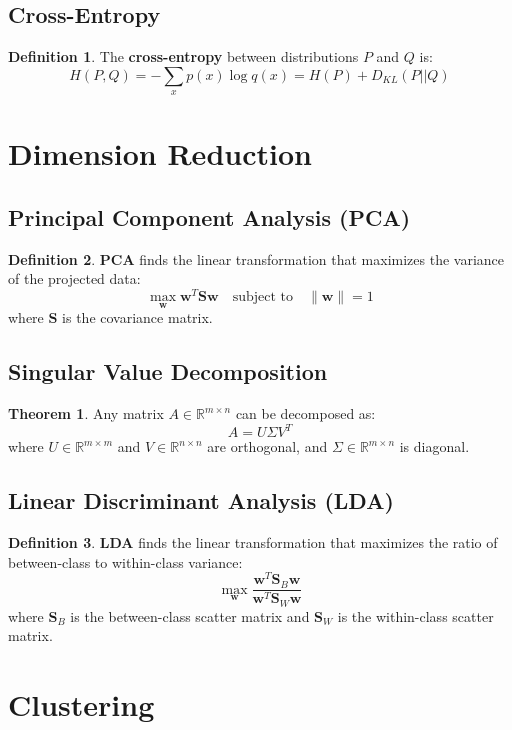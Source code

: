 \documentclass[11pt]{article}
\theoremstyle{definition}
\newtheorem{definition}{Definition}[section]
\newtheorem{theorem}{Theorem}[section]
\begin{document}
\subsection{Cross-Entropy}
\begin{definition}
The \textbf{cross-entropy} between distributions $P$ and $Q$ is:
$$H(P,Q) = -\sum_x p(x) \log q(x) = H(P) + D_{KL}(P||Q)$$
\end{definition}

\section{Dimension Reduction}

\subsection{Principal Component Analysis (PCA)}
\begin{definition}
\textbf{PCA} finds the linear transformation that maximizes the variance of the projected data:
$$\max_{\mathbf{w}} \mathbf{w}^T \mathbf{S} \mathbf{w} \quad \text{subject to} \quad \|\mathbf{w}\| = 1$$
where $\mathbf{S}$ is the covariance matrix.
\end{definition}

\subsection{Singular Value Decomposition}
\begin{theorem}
Any matrix $A \in \mathbb{R}^{m \times n}$ can be decomposed as:
$$A = U \Sigma V^T$$
where $U \in \mathbb{R}^{m \times m}$ and $V \in \mathbb{R}^{n \times n}$ are orthogonal, and $\Sigma \in \mathbb{R}^{m \times n}$ is diagonal.
\end{theorem}

\subsection{Linear Discriminant Analysis (LDA)}
\begin{definition}
\textbf{LDA} finds the linear transformation that maximizes the ratio of between-class to within-class variance:
$$\max_{\mathbf{w}} \frac{\mathbf{w}^T \mathbf{S}_B \mathbf{w}}{\mathbf{w}^T \mathbf{S}_W \mathbf{w}}$$
where $\mathbf{S}_B$ is the between-class scatter matrix and $\mathbf{S}_W$ is the within-class scatter matrix.
\end{definition}

\section{Clustering}
\end{document}
